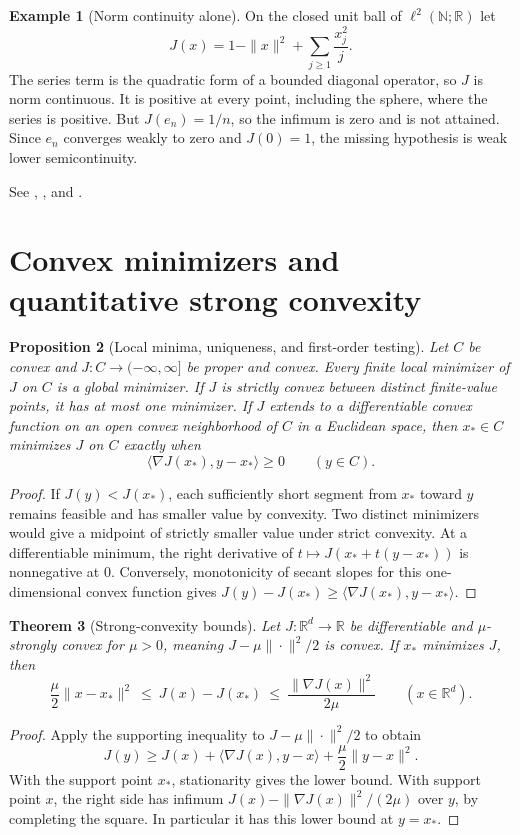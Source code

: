 \documentclass[11pt,oneside,openany]{book}
\theoremstyle{plain}
\newtheorem{theorem}{Theorem}[chapter]
\newtheorem{proposition}[theorem]{Proposition}
\theoremstyle{definition}
\newtheorem{example}[theorem]{Example}
\theoremstyle{remark}
\begin{document}
\begin{example}[Norm continuity alone]
On the closed unit ball of \(\ell^2(\mathbb N;\mathbb R)\) let
\[
 J(x)=1-\|x\|^2+\sum_{j\ge1}\frac{x_j^2}{j}.
\]
The series term is the quadratic form of a bounded diagonal operator,
so \(J\) is norm continuous. It is positive at every point, including
the sphere, where the series is positive. But \(J(e_n)=1/n\), so the
infimum is zero and is not attained. Since \(e_n\) converges weakly to
zero and \(J(0)=1\), the missing hypothesis is weak lower
semicontinuity.
\end{example}

See \cite[Chapter II, Section 1]{EkelandTemam},
\cite[Section 27]{Rockafellar}, and \cite[Chapter 3]{Dacorogna}.

\section{Convex minimizers and quantitative strong convexity}
\label{v03-03}

\begin{proposition}[Local minima, uniqueness, and first-order testing]
\label{prop:v03-03-01}
Let \(C\) be convex and \(J:C\to(-\infty,\infty]\) be proper and convex.
Every finite local minimizer of \(J\) on \(C\) is a global minimizer.
If \(J\) is strictly convex between distinct finite-value points, it has
at most one minimizer. If \(J\) extends to a differentiable convex
function on an open convex neighborhood of \(C\) in a Euclidean space,
then \(x_*\in C\) minimizes \(J\) on \(C\) exactly when
\[
 \langle \nabla J(x_*),y-x_*\rangle\ge0 \qquad(y\in C).
\]
\end{proposition}
\begin{proof}
If \(J(y)<J(x_*)\), each sufficiently short segment from \(x_*\)
toward \(y\) remains feasible and has smaller value by convexity.
Two distinct minimizers would give a midpoint of strictly smaller value
under strict convexity. At a differentiable minimum, the right
derivative of \(t\mapsto J(x_*+t(y-x_*))\) is nonnegative at \(0\).
Conversely, monotonicity of secant slopes for this one-dimensional
convex function gives
\(J(y)-J(x_*)\ge\langle\nabla J(x_*),y-x_*\rangle\).
\end{proof}

\begin{theorem}[Strong-convexity bounds]
\label{thm:v03-03-02}
Let \(J:\mathbb R^d\to\mathbb R\) be differentiable and
\(\mu\)-strongly convex for \(\mu>0\), meaning
\(J-\mu\|\cdot\|^2/2\) is convex. If \(x_*\) minimizes \(J\), then
\[
 \frac{\mu}{2}\|x-x_*\|^2
 \ \le\ J(x)-J(x_*)
 \ \le\ \frac{\|\nabla J(x)\|^2}{2\mu}\qquad(x\in\mathbb R^d).
\]
\end{theorem}
\begin{proof}
Apply the supporting inequality to \(J-\mu\|\cdot\|^2/2\) to obtain
\[
 J(y)\ge J(x)+\langle\nabla J(x),y-x\rangle
                  +\frac{\mu}{2}\|y-x\|^2.
\]
With the support point \(x_*\), stationarity gives the lower bound.
With support point \(x\), the right side has infimum
\(J(x)-\|\nabla J(x)\|^2/(2\mu)\) over \(y\), by completing the square.
In particular it has this lower bound at \(y=x_*\).
\end{proof}
\end{document}
